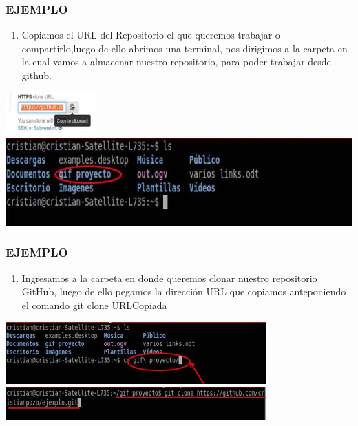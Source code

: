 \documentclass[8pt]{beamer}
\begin{document}
\begin{frame}
\frametitle{EJEMPLO}
\begin{enumerate}[5. ]
	\justifying
    \item Copiamos el URL del Repositorio el que queremos trabajar o compartirlo,luego de ello abrimos una terminal, nos dirigimos a la carpeta en la cual vamos a almacenar nuestro repositorio, para poder trabajar desde github.
\end{enumerate}
\begin{center}
\includegraphics[width=3.5cm]{img/b5}\\
\includegraphics[width=7 cm]{img/b6}\\
\fontsize{6}{1}
\end{center}
\end{frame}

\begin{frame}
\frametitle{EJEMPLO}
\begin{enumerate}[6. ]
	\justifying
    \item Ingresamos a la carpeta en donde queremos clonar nuestro repositorio GitHub, luego de ello pegamos la dirección URL que copiamos  anteponiendo el comando git clone URLCopiada\\
\end{enumerate}
\begin{center}
\includegraphics[width=10cm]{img/b7}\\
\includegraphics[width=10cm]{img/b8}\\
\fontsize{6}{1}
\end{center}
\end{frame}
\end{document}
